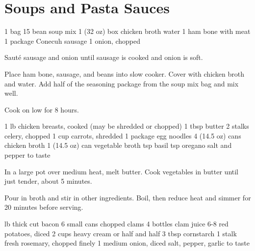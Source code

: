 \chapter{Soups and Pasta Sauces}
\begin{comment}
Pasta is cheap, and soups can be prepared
in rather large batches --
perfect when you're on a college student budget (we are).
\end{comment}

\freezerfriendly
{}
\begin{ingreds}
  1 bag 15 bean soup mix
  1 (32 oz) box chicken broth
  water
  1 ham bone with meat
  1 package Conecuh sausage
  1 onion, chopped
\end{ingreds}

\begin{method}
  Saut\'e sausage and onion until sausage
  is cooked and onion is soft.

  Place ham bone, sausage, and beans into slow cooker.
  Cover with chicken broth and water.
  Add half of the seasoning package from the soup mix bag and mix well.

  Cook on low for 8 hours.
\end{method}

\serves{}
\preptime{}
\cooktime{}
\freezerfriendly
\begin{ingreds}
  1 lb chicken breasts, cooked (may be shredded or chopped)
  1 tbsp butter
  2 stalks celery, chopped
  1 cup carrots, shredded
  1 package egg noodles
  4 (14.5 oz) cans chicken broth
  1 (14.5 oz) can vegetable broth
   tsp basil
   tsp oregano
  salt and pepper to taste
\end{ingreds}

\begin{method}
  In a large pot over medium heat, melt butter.
  Cook vegetables in butter until just tender, about 5 minutes.

  Pour in broth and stir in other ingredients.
  Boil, then reduce heat and simmer for 20 minutes before serving.
\end{method}

\freezerfriendly
\begin{ingreds}
   lb thick cut bacon
  6 small cans chopped clams
  4 bottles clam juice
  6-8 red potatoes, diced
  2 cups heavy cream or half and half
  3 tbsp cornstarch
  1 stalk fresh rosemary, chopped finely
  1 medium onion, diced
  salt, pepper, garlic to taste
\end{ingreds}

